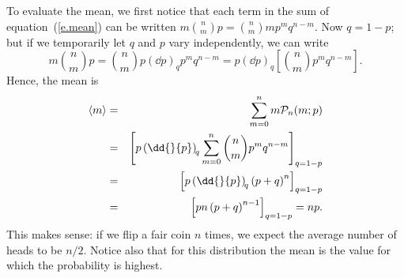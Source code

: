 To evaluate the mean, we first notice that each term in the sum of equation~(\ref{e.mean}) can be written $m\binom{n}{m}{p} = {n\choose m} m p^{m} q^{n-m}$.  Now $q = 1-p$; but if we temporarily let $q$ and $p$ vary independently, we can write
\[ 
	m\binom{n}{m}{p} = {n\choose m}p\left(\dd{}{p}\right)_{\!q} p^{m}q^{n-m}
	= p\left(\dd{}{p}\right)_{\!q}\left[{n\choose m}p^{m}q^{n-m}\right].
\]
Hence, the mean is
\begin{eqnarray}
	\mean{m} &=& \sum_{m=0}^{n}m\binom{n}{m}{p} \nonumber\\
	&=& \left[p\left(\dd{}{p}\right)_{\!q}\sum_{m=0}^{n}{n\choose m}p^{m}q^{n-m}\right]_{q=1-p}\nonumber\\
	&=& \left[p\left(\dd{}{p}\right)_{\!q}\left(p+q\right)^{n}\right]_{q=1-p}\nonumber\\
	&=& \left[pn\left(p+q\right)^{n-1}\right]_{q=1-p} = np.
\end{eqnarray}
This makes sense: if we flip a fair coin $n$ times, we expect the average number of heads to be $n/2$.  Notice also that for this distribution the mean is the value for which the probability is highest.

